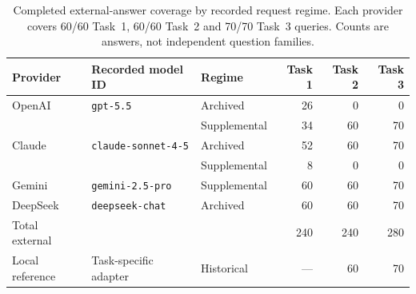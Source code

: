 \begin{table}[ht]
\centering
\scriptsize
\caption{Completed external-answer coverage by recorded request regime. Each provider covers 60/60 Task~1, 60/60 Task~2 and 70/70 Task~3 queries. Counts are answers, not independent question families.}
\label{tab:external-coverage}
\setlength{\tabcolsep}{4pt}
\renewcommand{\arraystretch}{1.08}
\begin{tabular}{@{}l l l r r r@{}}
\toprule
\textbf{Provider} & \textbf{Recorded model ID} & \textbf{Regime} & \textbf{Task 1} & \textbf{Task 2} & \textbf{Task 3} \\
\midrule
OpenAI & \texttt{gpt-5.5} & Archived & 26 & 0 & 0 \\
 & & Supplemental & 34 & 60 & 70 \\
Claude & \texttt{claude-sonnet-4-5} & Archived & 52 & 60 & 70 \\
 & & Supplemental & 8 & 0 & 0 \\
Gemini & \texttt{gemini-2.5-pro} & Supplemental & 60 & 60 & 70 \\
DeepSeek & \texttt{deepseek-chat} & Archived & 60 & 60 & 70 \\
\midrule
Total external & & & 240 & 240 & 280 \\
Local reference & Task-specific adapter & Historical & --- & 60 & 70 \\
\bottomrule
\end{tabular}
\end{table}
